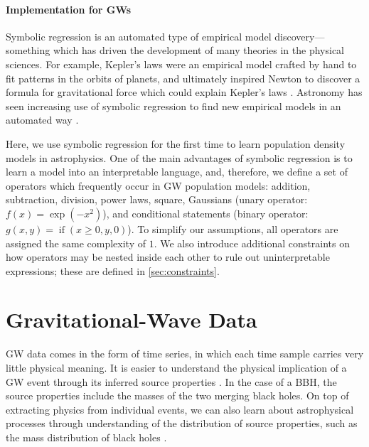 \documentclass[nohyperref]{article}
\theoremstyle{plain}
\theoremstyle{definition}
\theoremstyle{remark}
\begin{document}
\paragraph{Implementation for GWs}
Symbolic regression is an automated type of empirical model discovery---something which has driven the development of many theories in the physical sciences.
For example, Kepler's laws were an empirical model crafted by hand to fit patterns in the orbits of planets, and ultimately inspired Newton to discover a formula for gravitational force which could explain Kepler's laws \citep[see][for a review of this history]{hawkingShouldersGiantsGreat2004}.
Astronomy has seen increasing use of symbolic regression to find new empirical models in an automated way \citep[e.g.,][]{grahamMachineassistedDiscoveryRelationships2013,cranmerDiscoveringSymbolicModels2020,wadekarModelingAssemblyBias2020,delgadoModelingGalaxyhaloConnection2021,cranmerHistogramPoolingOperators2021,shaoFindingUniversalRelations2021}.

Here, we use symbolic regression for the first time to learn population density models in astrophysics.
One of the main advantages of symbolic regression is to learn a model into an interpretable language, and, therefore, we define a set of operators which frequently occur in GW population models: addition, subtraction, division, power laws, square, Gaussians (unary operator: $f(x)=\exp(-x^2)$), and conditional statements (binary operator: $g(x, y)=\operatorname{if}(x \geq 0, y, 0)$). 
To simplify our assumptions, all operators are assigned the same complexity of $1$.
We also introduce additional constraints on how operators may be nested inside each other to rule out uninterpretable expressions; these are defined in \cref{sec:constraints}.

\section{Gravitational-Wave Data}
\label{sec:GWdata}

GW data comes in the form of time series, in which each time sample carries very little physical meaning.
It is easier to understand the physical implication of a GW event through its inferred source properties \cite{Veitch:2014wba}.
In the case of a BBH, the source properties include the masses of the two merging black holes.
On top of extracting physics from individual events,
we can also learn about astrophysical processes through understanding of the distribution of source properties, such as the mass distribution of black holes \cite{2019PASA...36...10T,Vitale:2020aaz}.
\end{document}
